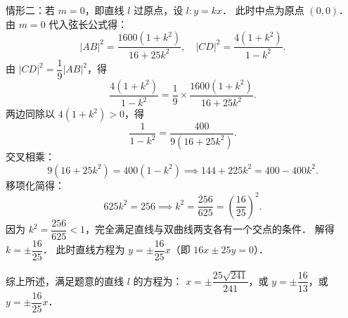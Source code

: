 \begin{answer}
情形二：若 $m = 0$，即直线 $l$ 过原点，设 $l: y = kx$．
此时中点为原点 $(0, 0)$．
由 $m = 0$ 代入弦长公式得：
\nopagebreak[4]
\[
|AB|^2 = \dfrac{1600(1 + k^2)}{16 + 25k^2}, \quad |CD|^2 = \dfrac{4(1 + k^2)}{1 - k^2}.
\]
由 $|CD|^2 = \dfrac{1}{9}|AB|^2$，得
\nopagebreak[4]
\[
\dfrac{4(1 + k^2)}{1 - k^2} = \dfrac{1}{9} \times \dfrac{1600(1 + k^2)}{16 + 25k^2}.
\]
两边同除以 $4(1 + k^2) > 0$，得
\nopagebreak[4]
\[
\dfrac{1}{1 - k^2} = \dfrac{400}{9(16 + 25k^2)}.
\]
交叉相乘：
\nopagebreak[4]
\[
9(16 + 25k^2) = 400(1 - k^2) \implies 144 + 225k^2 = 400 - 400k^2.
\]
移项化简得：
\nopagebreak[4]
\[
625k^2 = 256 \implies k^2 = \dfrac{256}{625} = \left(\dfrac{16}{25}\right)^2.
\]
因为 $k^2 = \dfrac{256}{625} < 1$，完全满足直线与双曲线两支各有一个交点的条件．
解得 $k = \pm \dfrac{16}{25}$．
此时直线方程为 $y = \pm \dfrac{16}{25}x$（即 $16x \pm 25y = 0$）．

综上所述，满足题意的直线 $l$ 的方程为：
$x = \pm \dfrac{25\sqrt{241}}{241}$，或 $y = \pm \dfrac{16}{13}$，或 $y = \pm \dfrac{16}{25}x$．


\end{answer}